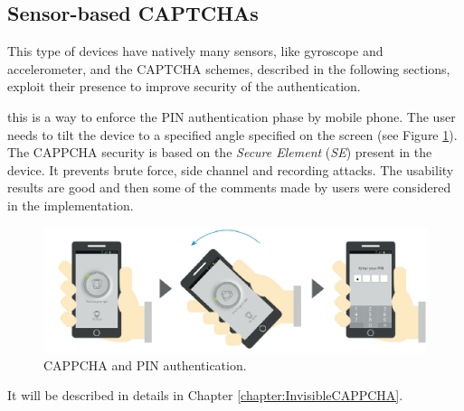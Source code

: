\subsection{Sensor-based CAPTCHAs}
This type of devices have natively many sensors, like gyroscope and accelerometer, and the CAPTCHA schemes, described in the following sections, exploit their presence to improve security of the authentication.
\begin{itemize}
{this is a way to enforce the PIN authentication phase by mobile phone\cite{CAPPCHA}. The user needs to tilt the device to a specified angle specified on the screen (see Figure \ref{soa:CAPPCHA}). The CAPPCHA security is based on the \textit{Secure Element} (\textit{SE}) present in the device. It prevents brute force, side channel and recording attacks. The usability results are good and then some of the comments made by users were considered in the implementation.
\begin{figure}[h]
     \centering
     \includegraphics[width=.8\linewidth]{Images/StateOfArt/CAPPCHA}
     \caption{\footnotesize{CAPPCHA and PIN authentication\cite{CAPPCHA}.}}\label{soa:CAPPCHA}
\end{figure}
}
{It will be described in details in Chapter \ref{chapter:InvisibleCAPPCHA}.}
\end{itemize}

